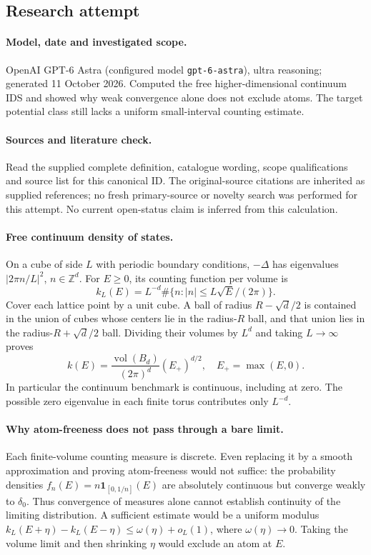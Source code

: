 \documentclass[11pt]{article}
\begin{document}
\subsection{Research attempt}
\paragraph{Model, date and investigated scope.}
OpenAI GPT-6 Astra (configured model \texttt{gpt-6-astra}), ultra reasoning; generated 11 October 2026. Computed the free higher-dimensional continuum IDS and showed why weak convergence alone does not exclude atoms. The target potential class still lacks a uniform small-interval counting estimate.

\paragraph{Sources and literature check.}
Read the supplied complete definition, catalogue wording, scope qualifications and source list for this canonical ID. The original-source citations are inherited as supplied references; no fresh primary-source or novelty search was performed for this attempt. No current open-status claim is inferred from this calculation.

\paragraph{Free continuum density of states.}On a cube of side \(L\) with periodic boundary conditions, \(-\Delta\) has eigenvalues \(|2\pi n/L|^2\), \(n\in\mathbb Z^d\). For \(E\ge0\), its counting function per volume is
\[k_L(E)=L^{-d}\#\{n:|n|\le L\sqrt E/(2\pi)\}.
\]
Cover each lattice point by a unit cube. A ball of radius \(R-\sqrt d/2\) is contained in the union of cubes whose centers lie in the radius-\(R\) ball, and that union lies in the radius-\(R+\sqrt d/2\) ball. Dividing their volumes by \(L^d\) and taking \(L\to\infty\) proves
\[k(E)=\frac{\operatorname{vol}(B_d)}{(2\pi)^d}(E_+)^{d/2},\quad E_+=\max(E,0).
\]
In particular the continuum benchmark is continuous, including at zero. The possible zero eigenvalue in each finite torus contributes only \(L^{-d}\).
\paragraph{Why atom-freeness does not pass through a bare limit.}Each finite-volume counting measure is discrete. Even replacing it by a smooth approximation and proving atom-freeness would not suffice: the probability densities \(f_n(E)=n\mathbf1_{[0,1/n]}(E)\) are absolutely continuous but converge weakly to \(\delta_0\). Thus convergence of measures alone cannot establish continuity of the limiting distribution. A sufficient estimate would be a uniform modulus \(k_L(E+\eta)-k_L(E-\eta)\le\omega(\eta)+o_L(1)\), where \(\omega(\eta)\to0\). Taking the volume limit and then shrinking \(\eta\) would exclude an atom at \(E\).
\end{document}
